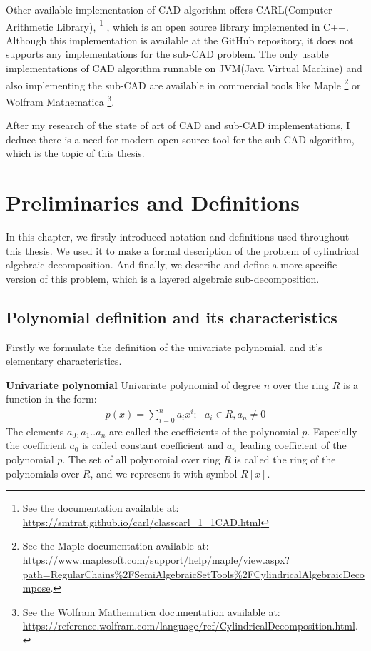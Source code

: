 \documentclass[
  digital, %
  twoside, %
  table,   %
  nolof,     %
  nolot,     %
]{fithesis3}
\begin{document}
Other available implementation of CAD algorithm offers CARL(Computer Arithmetic Library),
\footnote{
  See the documentation available at: \url{https://smtrat.github.io/carl/classcarl_1_1CAD.html}
}
, which is an open source library implemented in C++. Although this implementation is available at the GitHub repository, it does not supports any implementations for the sub-CAD problem.
The only usable implementations of CAD algorithm runnable on JVM(Java Virtual Machine) and also implementing the sub-CAD are available in commercial tools like Maple 
\footnote{
See the Maple documentation available at: \url{https://www.maplesoft.com/support/help/maple/view.aspx?path=RegularChains\%2FSemiAlgebraicSetTools\%2FCylindricalAlgebraicDecompose}.
}
or Wolfram Mathematica 
\footnote{
  See the Wolfram Mathematica documentation available at: \url{https://reference.wolfram.com/language/ref/CylindricalDecomposition.html}.
}.

After my research of the state of art of CAD and sub-CAD implementations, I deduce there is a need for modern open source tool for the sub-CAD algorithm, which is the  topic of this thesis.

\chapter{Preliminaries and Definitions}
In this chapter, we firstly introduced notation and definitions used throughout this thesis. We used it to make a formal description of the problem of cylindrical algebraic decomposition. And finally, we describe and define a more specific version of this problem, which is a layered algebraic sub-decomposition.
\section{Polynomial definition and its characteristics}
Firstly we formulate the definition of the univariate polynomial, and it's elementary characteristics.
\begin{definition}{\textbf{Univariate polynomial}}
\newline
Univariate polynomial of degree $n$ over the ring $R$ is a function in the form:
\begin{align*}
p(x) =  \sum_{i=0}^n a_ix^i;\ \ \  a_i \in R, a_n \neq 0 
\end{align*}
The elements $a_0, a_1 .. a_n$ are called the coefficients of the polynomial $p$. Especially the coefficient $a_0$ is called constant coefficient and $a_n$ leading coefficient of the polynomial $p$.
\newline\newline
The set of all polynomial over ring $R$ is called the ring of the polynomials over $R$, and we represent it with symbol $R[x]$.
\end{definition}
\end{document}
